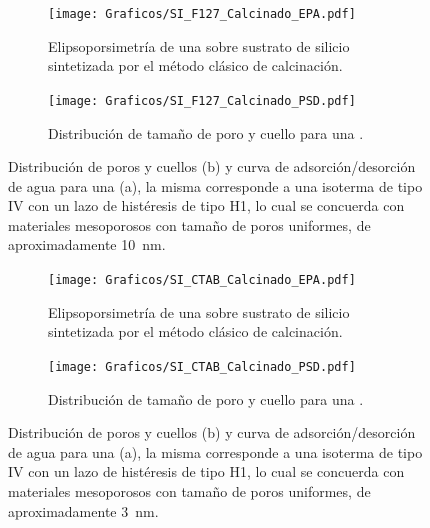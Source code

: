 		     	  	\begin{figure}[!ht]
		     	  		\begin{subfigure}[t]{0.495\textwidth}
		     	  		\texttt{[image: Graficos/SI\_F127\_Calcinado\_EPA.pdf]}
						\caption[Elipsoporsimetría \pdmF\space calcianda.]{Elipsoporsimetría de una \pdmF\space sobre sustrato de silicio sintetizada por el método clásico de calcinación.}
						\label{fig:F127_EPA}
						\end{subfigure}
						\begin{subfigure}[t]{0.495\textwidth}
		     	  		\texttt{[image: Graficos/SI\_F127\_Calcinado\_PSD.pdf]}
						\caption[Distribución \pdmF.]{Distribución de tamaño de poro y cuello para una \pdmF\space.}
						\label{fig:F127_PSD}
						\end{subfigure}
						\caption[Elipsoporosimetría para sistemas \pdmF.]{Distribución de poros y cuellos (b) y curva de adsorción/desorción de agua para una \pdmF (a), la misma corresponde a una isoterma de tipo IV con un lazo de histéresis de tipo H1, lo cual se concuerda con materiales mesoporosos con tamaño de poros uniformes, de aproximadamente \SI{10}{\nm}.}
						\end{figure}
					\begin{figure}[!ht]
		     	  		\begin{subfigure}[t]{0.495\textwidth}
		     	  		\texttt{[image: Graficos/SI\_CTAB\_Calcinado\_EPA.pdf]}
						\caption[Elipsoporsimetría \pdmF\space calcianda.]{Elipsoporsimetría de una \pdmF\space sobre sustrato de silicio sintetizada por el método clásico de calcinación.}
						\label{fig:CTAB_EPA}
						\end{subfigure}
						\begin{subfigure}[t]{0.495\textwidth}
		     	  		\texttt{[image: Graficos/SI\_CTAB\_Calcinado\_PSD.pdf]}
						\caption[Distribución \pdmC.]{Distribución de tamaño de poro y cuello para una \pdmC\space.}
						\label{fig:CTAB_PSD}
						\end{subfigure}
						\caption[Elipsoporosimetría para sistemas \pdmC.]{Distribución de poros y cuellos (b) y curva de adsorción/desorción de agua para una \pdmC (a), la misma corresponde a una isoterma de tipo IV con un lazo de histéresis de tipo H1, lo cual se concuerda con materiales mesoporosos con tamaño de poros uniformes, de aproximadamente \SI{3}{\nm}.}
						\end{figure}	
		
